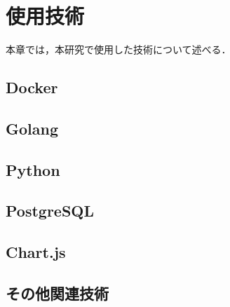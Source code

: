 \section{使用技術}\label{sec2}

本章では，本研究で使用した技術について述べる．

\subsection{Docker}


\subsection{Golang}


\subsection{Python}


\subsection{PostgreSQL}


\subsection{Chart.js}


\subsection{その他関連技術}
